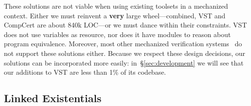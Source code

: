 \documentclass[acmsmall,screen]{acmart}
\newcommand{\tx}[1]{\text{#1}}
\begin{document}
These solutions are
not viable when using existing toolsets in a mechanized context.
Either we must reinvent a \textbf{very} large wheel---combined,
VST and CompCert are about 840k LOC---or we must dance within their constraints.
VST does not use variables as resource, nor does it have modules to reason about program equivalence.  Moreover, most other mechanized verification systems~\cite{beckert:2007,distefanop08,bengtson:charge,chin:hipsleek} do not support these solutions either.  
Because we respect these design decisions, our solutions can be incorporated 
more easily: in~\S\ref{sec:development} we will see that our additions to VST are less than 1\% of its codebase.

\subsection{Linked Existentials}
\label{sec:linkedex}

\renewcommand{\tx}[1]{\scriptsize {\text{#1}}}

\end{document}
